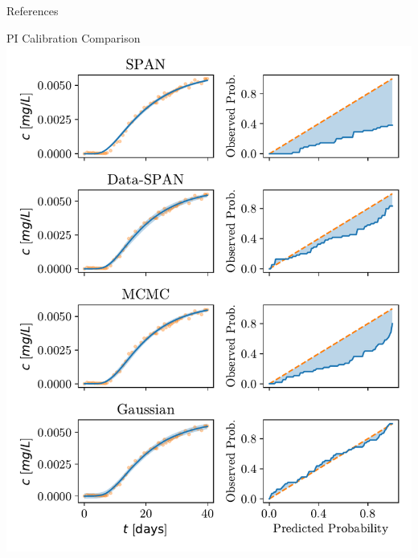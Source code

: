 \documentclass[aspectratio=1610]{beamer}
\begin{document}





\begin{frame}{References}
\printbibliography
\end{frame}


\begin{frame}{PI Calibration Comparison}
    \centering
    \includegraphics[height=0.9\textheight]{figs/reliability_curves.pdf}
\end{frame}
\end{document}
